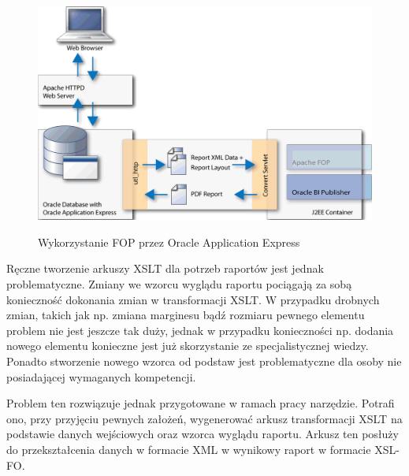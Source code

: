 \documentclass[11pt,a4paper]{article}
\begin{document}
\begin{figure}[h]
\centering
\caption{Wykorzystanie FOP przez Oracle Application Express}
\includegraphics[scale=0.5]{apex_fop_usage}
\label{img:apex_fop}
\end{figure}

Ręczne tworzenie arkuszy XSLT dla potrzeb raportów jest jednak problematyczne. Zmiany we wzorcu wyglądu raportu pociągają za sobą konieczność dokonania zmian w transformacji XSLT. W przypadku drobnych zmian, takich jak np. zmiana marginesu bądź rozmiaru pewnego elementu problem nie jest jeszcze tak duży, jednak w przypadku konieczności np. dodania nowego elementu konieczne jest już skorzystanie ze specjalistycznej wiedzy. Ponadto stworzenie nowego wzorca od podstaw jest problematyczne dla osoby nie posiadającej wymaganych kompetencji.

Problem ten rozwiązuje jednak przygotowane w ramach pracy narzędzie. Potrafi ono, przy przyjęciu pewnych założeń, wygenerować arkusz transformacji XSLT na podstawie danych wejściowych oraz wzorca wyglądu raportu. Arkusz ten posłuży do przekształcenia danych w formacie XML w wynikowy raport w formacie XSL-FO. 
\end{document}
